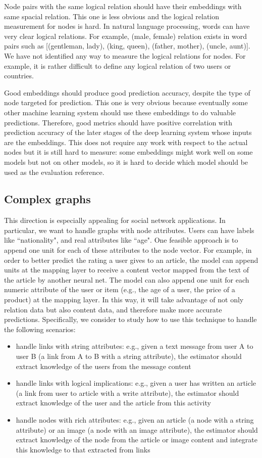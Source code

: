 \documentclass[12pt]{WSUThesis}
\theoremstyle{definition}
\begin{document}
Node pairs with the same logical relation should have their embeddings with same spacial relation.
This one is less obvious and the logical relation measurement for nodes is hard.
In natural language processing, words can have very clear logical relations.
For example, (male, female) relation exists in word pairs such as [(gentleman, lady), (king, queen), (father, mother), (uncle, aunt)].
We have not identified any way to measure the logical relations for nodes.
For example, it is rather difficult to define any logical relation of two users or countries.

Good embeddings should produce good prediction accuracy, despite the type of node targeted for prediction.
This one is very obvious because eventually some other machine learning system should use these embeddings to do valuable predictions.
Therefore, good metrics should have positive correlation with prediction accuracy of the later stages of the deep learning system whose inputs are the embeddings.
This does not require any work with respect to the actual nodes but it is still hard to measure: some embeddings might work well on some models but not on other models, so it is hard to decide which model should be used as the evaluation reference.

\subsection{Complex graphs}
This direction is especially appealing for social network applications.
In particular, we want to handle graphs with node attributes.
Users can have labels like ``nationality", and real attributes like ``age".
One feasible approach is to append one unit for each of these attributes to the node vector.
For example, in order to better predict the rating a user gives to an article,
the model can append units at the mapping layer to receive a content vector 
mapped from the text of the article by another neural net.
The model can also append one unit for each numeric attribute of the user or 
item (e.g., the age of a user, the price of a product) at the mapping layer.
In this way, it will take advantage of not only relation data but also content 
data, and therefore make more accurate predictions.
Specifically, we consider to study how to use this technique to handle the 
following scenarios:
\begin{itemize}
	\item handle links with string attributes: e.g., given a text message from 
	user A to user B (a link from A to B with a string attribute), the 
	estimator should extract knowledge of the users from the message content
	\item handle links with logical implications: e.g., given a user has 
	written an article (a link from user to article with a write attribute), 
	the estimator should extract knowledge of the user and the article from 
	this activity
	\item handle nodes with rich attributes: e.g., given an article (a node 
	with a string attribute) or an image (a node with an image attribute), the 
	estimator should extract knowledge of the node from the article or image 
	content and integrate this knowledge to that extracted from links
\end{itemize}
\end{document}
